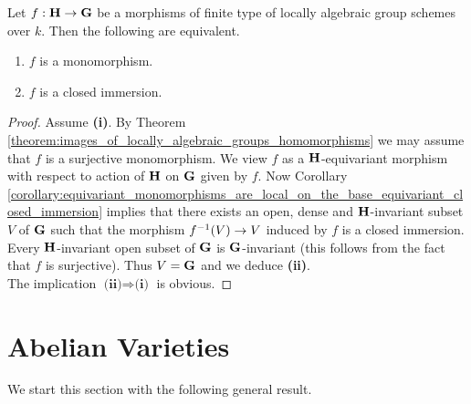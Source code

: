 \begin{corollary}\label{corollary:monomorphisms_of_algebraic_groups}
Let $f:\mathbf{H}\rightarrow \mathbf{G}$ be a morphisms of finite type of locally algebraic group schemes over $k$. Then the following are equivalent.
\begin{enumerate}[label=\emph{\textbf{(\roman*)}}, leftmargin=3.0em]
\item $f$ is a monomorphism.
\item $f$ is a closed immersion.
\end{enumerate}
\end{corollary}
\begin{proof}
Assume \textbf{(i)}. By Theorem \ref{theorem:images_of_locally_algebraic_groups_homomorphisms} we may assume that $f$ is a surjective monomorphism. We view $f$ as a $\mathbf{H}$-equivariant morphism with respect to action of $\mathbf{H}$ on $\mathbf{G}$ given by $f$. Now Corollary \ref{corollary:equivariant_monomorphisms_are_local_on_the_base_equivariant_closed_immersion} implies that there exists an open, dense and $\mathbf{H}$-invariant subset $V$ of $\mathbf{G}$ such that the morphism $f^{-1}(V)\rightarrow V$ induced by $f$ is a closed immersion. Every $\mathbf{H}$-invariant open subset of $\mathbf{G}$ is $\mathbf{G}$-invariant (this follows from the fact that $f$ is surjective). Thus $V = \mathbf{G}$ and we deduce \textbf{(ii)}.\\
The implication $\textbf{(ii)}\Rightarrow \textbf{(i)}$ is obvious.
\end{proof}

\section{Abelian Varieties}
\noindent
We start this section with the following general result.


